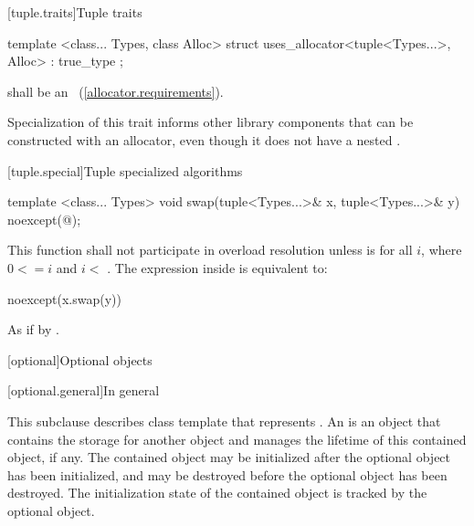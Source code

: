 [tuple.traits]{Tuple traits}

\begin{itemdecl}
template <class... Types, class Alloc>
  struct uses_allocator<tuple<Types...>, Alloc> : true_type { };
\end{itemdecl}

\begin{itemdescr}
\requires {} shall be an ~(\ref{allocator.requirements}).

\pnum
\enternote Specialization of this trait informs other library components that
 can be constructed with an allocator, even though it does not have
a nested . \exitnote
\end{itemdescr}

[tuple.special]{Tuple specialized algorithms}

%
\begin{itemdecl}
template <class... Types>
  void swap(tuple<Types...>& x, tuple<Types...>& y) noexcept(@\seebelow@);
\end{itemdecl}

\begin{itemdescr}
\pnum
\remarks This function shall not participate in overload resolution
unless  is 
for all $i$, where $0 <= i$ and $i <$ .
The expression inside  is equivalent to:

\begin{codeblock}
noexcept(x.swap(y))
\end{codeblock}

\pnum
\effects As if by .
\end{itemdescr}

[optional]{Optional objects}

[optional.general]{In general}

\pnum
This subclause describes class template  that represents
. An  is an
object that contains the storage for another object and manages the lifetime of
this contained object, if any. The contained object may be initialized after
the optional object has been initialized, and may be destroyed before the
optional object has been destroyed. The initialization state of the contained
object is tracked by the optional object.

